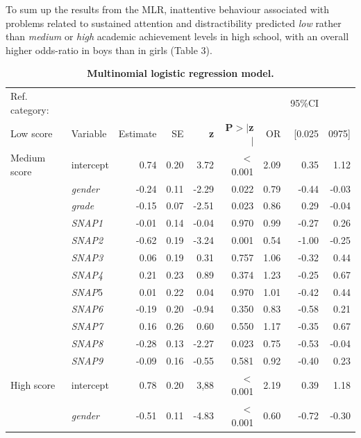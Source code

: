 \documentclass[10pt,letterpaper]{article}
\begin{document}
{{To sum up the results from the MLR, inattentive behaviour associated with problems related to sustained attention and distractibility predicted {\it low} rather than {\it medium}
or {\it high} academic achievement levels in high school, with an overall higher odds-ratio in boys than in girls (Table 3). \\




\vspace{3mm}

\begin{table}[H]
\centering
\caption{\bf Multinomial logistic regression model.} 
\begin{tabular}{|llrrrr|rrr|}
  \hline
Ref. category: &&&&&&&95\%CI&\\
Low score & Variable &Estimate & SE & \textbf{z} & \textbf{P$>$$|$z$|$} &  OR &  [0.025 & 0975]\\ 
 \hline
  \hline
Medium score & intercept  & 0.74 & 0.20 & 3.72 & $<$0.001 & 2.09 &   0.35 & 1.12 \\ 
\hline
  & {\it gender} & -0.24 & 0.11 & -2.29 & 0.022 & 0.79 &  -0.44 & -0.03  \\ 
 \hline
  & {\it grade} & -0.15 & 0.07 & -2.51 & 0.023& 0.86 &  0.29 & -0.04  \\ 
 \hline
  & {\it SNAP1} & -0.01 & 0.14 & -0.04 & 0.970 & 0.99 &  -0.27 & 0.26 \\ 
  \hline
  &  {\it SNAP2} & -0.62 & 0.19 & -3.24 & 0.001 & 0.54 &  -1.00 & -0.25  \\ 
  \hline
  &  {\it SNAP3} & 0.06 & 0.19 & 0.31 & 0.757& 1.06 &  -0.32 & 0.44 \\ 
  \hline
  & {\it SNAP4} & 0.21 & 0.23 & 0.89 & 0.374 & 1.23 &  -0.25 & 0.67  \\ 
  \hline
  &  {\it SNAP}5 & 0.01 & 0.22 & 0.04 & 0.970 & 1.01 & -0.42 & 0.44 \\ 
  \hline
  &  {\it SNAP6} & -0.19 & 0.20 & -0.94 & 0.350 &  0.83 &  -0.58 & 0.21  \\ 
   \hline
  &  {\it SNAP7} & 0.16 & 0.26 & 0.60 & 0.550 & 1.17 &  -0.35 & 0.67  \\ 
  \hline
  &  {\it SNAP8} & -0.28 & 0.13 & -2.27 & 0.023 & 0.75 &  -0.53 & -0.04  \\ 
  \hline
  &  {\it SNAP9} & -0.09 & 0.16 & -0.55 & 0.581 & 0.92 &  -0.40 & 0.23  \\ 
   \hline
   \hline
   High score & intercept & 0.78 & 0.20 & 3,88 & $<$0.001 & 2.19 &  0.39 & 1.18  \\ 
  \hline
  &  {\it gender} & -0.51 & 0.11 & -4.83 & $<$0.001 & 0.60 &  -0.72 & -0.30  \\ 

\end{tabular}
\end{table}}}
\end{document}
